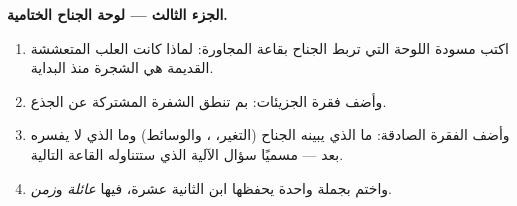 \begin{problem}
\medskip\noindent\textbf{الجزء الثالث --- لوحة الجناح
الختامية.}
\begin{enumerate}[resume]
  \item اكتب مسودة اللوحة التي تربط الجناح بقاعة 
        المجاورة: لماذا كانت العلب المتعششة القديمة هي
        الشجرة منذ البداية.
  \item وأضف فقرة الجزيئات: بم تنطق الشفرة المشتركة عن
        الجذع.
  \item وأضف الفقرة الصادقة: ما الذي يبينه الجناح
        (التغير، ، والوسائط) وما الذي لا يفسره
        بعد --- مسميًا سؤال الآلية الذي ستتناوله القاعة
        التالية.
  \item واختم بجملة واحدة يحفظها ابن الثانية عشرة، فيها
        \emph{عائلة} و\emph{زمن}.
\end{enumerate}
\end{problem}
